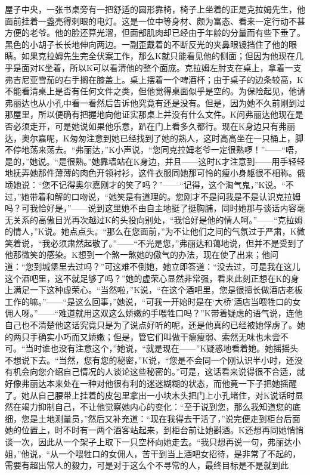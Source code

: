 \documentclass[12pt,a4paper]{article}
\begin{document}
屋子中央，一张书桌旁有一把舒适的圆形靠椅，椅子上坐着的正是克拉姆先生，他面前挂着一盏亮得刺眼的电灯。这是一位中等身材、颇为富态、看来一定行动不甚方便的老爷。他的脸还算光溜，但面部肌肉却已经由于年龄的分量而有些下垂了。黑色的小胡子长长地伸向两边。一副歪戴着的不断反光的夹鼻眼镜挡住了他的眼睛。如果克拉姆先生完全伏案工作，那么K就只能看见他的侧面；但因为他现在几乎是面对K坐着，所以K可以看清他的整个面庞。克拉姆左肘支在桌上，拿着一支弗吉尼亚雪茄的右手搁在膝盖上。桌上摆着一个啤酒杯；由于桌子的边条较高，K不能看清桌上是否有任何文件之类，但他觉得桌面似乎是空的。为保险起见，他请弗丽达也从小孔中看一看然后告诉他究竟有还是没有。但是，因为她不久前刚到过那屋里，所以便确有把握地向他证实那桌上并没有什么文件。K问弗丽达他现在是否必须走开，可是她说如果他乐意，趴在门上看多久都行。现在K身边只有弗丽达，奥尔嘉呢，K匆匆注意到她已经找到了她的熟人，这时高高坐在一只桶上，脚不停地荡来荡去。“弗丽达，”K小声说，“您同克拉姆老爷一定很熟啰！”——“唔，是的，”她说。“是很熟。”她靠墙站在K身边，并且——这时K才注意到——用手轻轻地抚弄她那件薄薄的肉色开领衬衫，这件衣服同她那可怜的瘦小身躯很不相称。俄顷她说：“您不记得奥尔嘉刚才的笑了吗？”——“记得，这个淘气鬼，”K说。“不过，”她带着和解的口吻说，“她笑是有道理的。您刚才不是问我是不是认识克拉姆吗？可我恰好是，”——说到这里她不由自主地挺了挺胸脯，同时她那与谈话内容毫无关系的高傲目光再次越过K的头投向别处，“我恰好是他的情人呵。”——“克拉姆的情人，”K说。她点点头。“那么在您面前，”为不让他们之间的气氛过于严肃，K微笑着说，“我必须肃然起敬了。”——“不光是您，”弗丽达和蔼地说，但并不是受到了他那微笑的感染。K想到一个煞一煞她的傲气的办法，现在使了出来；他问道：“您到城堡里去过吗？”可这难不倒她，她立即答道：“没去过，可是我在这儿这个酒吧里，这不就足够了吗？”她的虚荣心显然非常强，看来此刻正想在K的身上满足一下这种虚荣心。“当然啦，”K说，“在这个酒吧里，您是很擅长做酒店老板工作的嘛。”——“是这么回事，”她说，“可我一开始时是在‘大桥’酒店当喂牲口的女佣人呀。”——“难道就用这双这么娇嫩的手喂牲口吗？”K带着疑虑的语气说，连他自己也不清楚他这话究竟只是为了说点好听的呢，还是他真的已经被她俘虏了。她的两只手确实小巧而又娇嫩；但是，管它们叫做干瘪瘦弱、索然无味也未尝不可。“当时谁也没有注意这个，”她说，“就是现在——”K疑惑地看着她。她摇摇头不想说下去。“当然，您有您的秘密，”K说，“您是不会同一个刚认识半小时，还没有机会向您介绍自己情况的人谈论这些秘密的。”可是，这话看来说得很不合适，就好像弗丽达本来处在一种对他很有利的迷迷糊糊的状态，而他竟一下子把她摇醒了。她从自己腰带上挂着的皮包里拿出一小块木头把门上小孔堵住，对K说话时显然在竭力抑制自己，不让他觉察她内心的变化：“至于说到您，那么我知道您的底细，您是土地测量员，”然后又补充道：“现在我得去干活了，”说完便走到柜台后面她的位置上，时不时有一两个酒客站起来，到柜台前让她斟酒。K还想再同她悄悄谈一次，因此从一个架子上取下一只空杯向她走去。“我只想再说一句，弗丽达小姐，”他说，“从一个喂牲口的女佣人，苦干到当上酒吧女招待，是非常了不起的，需要有超出常人的毅力，可是对于这么个不寻常的人，最终目标是不是就到此
\end{document}
